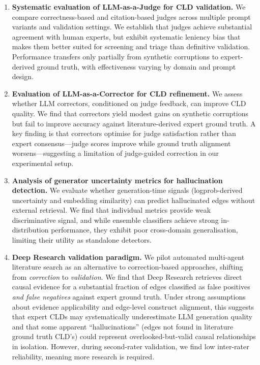 \begin{enumerate}
    \item \textbf{Systematic evaluation of LLM-as-a-Judge for CLD validation.} We compare correctness-based and citation-based judges across multiple prompt variants and validation settings. We establish that judges achieve substantial agreement with human experts, but exhibit systematic leniency bias that makes them better suited for screening and triage than definitive validation. Performance transfers only partially from synthetic corruptions to expert-derived ground truth, with effectiveness varying by domain and prompt design.
    
    \item \textbf{Evaluation of LLM-as-a-Corrector for CLD refinement.} We assess whether LLM correctors, conditioned on judge feedback, can improve CLD quality. We find that correctors yield modest gains on synthetic corruptions but fail to improve accuracy against literature-derived expert ground truth. A key finding is that correctors optimise for judge satisfaction rather than expert consensus---judge scores improve while ground truth alignment worsens---suggesting a limitation of judge-guided correction in our experimental setup.
    
    \item \textbf{Analysis of generator uncertainty metrics for hallucination detection.} We evaluate whether generation-time signals (logprob-derived uncertainty and embedding similarity) can predict hallucinated edges without external retrieval. We find that individual metrics provide weak discriminative signal, and while ensemble classifiers achieve strong in-distribution performance, they exhibit poor cross-domain generalisation, limiting their utility as standalone detectors.
    
    \item \textbf{Deep Research validation paradigm.} We pilot automated multi-agent literature search as an alternative to correction-based approaches, shifting from \emph{correction} to \emph{validation}. We find that Deep Research retrieves direct causal evidence for a substantial fraction of edges classified as false positives \emph{and false negatives} against expert ground truth. Under strong assumptions about evidence applicability and edge-level construct alignment, this suggests that expert CLDs may systematically underestimate LLM generation quality and that some apparent ``hallucinations'' (edges not found in literature ground truth CLD's) could represent overlooked-but-valid causal relationships in isolation. However, during second-rater validation, we find low inter-rater reliability, meaning more research is required.
    

\end{enumerate}
